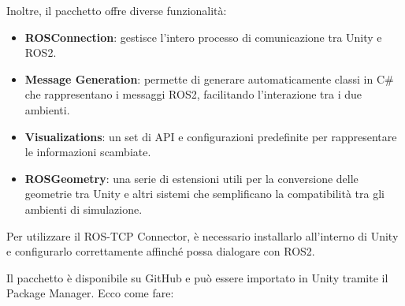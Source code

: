 \documentclass[11pt]{report}
\begin{document}
Inoltre, il pacchetto offre diverse funzionalità:

\begin{itemize}
    \item \textbf{ROSConnection}: gestisce l’intero processo di comunicazione tra Unity e ROS2.
    \item \textbf{Message Generation}: permette di generare automaticamente classi in C\# che rappresentano i messaggi ROS2, facilitando l’interazione tra i due ambienti.
    \item \textbf{Visualizations}: un set di API e configurazioni predefinite per rappresentare le informazioni scambiate.
    \item \textbf{ROSGeometry}: una serie di estensioni utili per la conversione delle geometrie tra Unity e altri sistemi che semplificano la compatibilità tra gli ambienti di simulazione.
\end{itemize}

Per utilizzare il ROS-TCP Connector, è necessario installarlo all’interno di Unity e configurarlo correttamente affinché possa dialogare con ROS2.

Il pacchetto è disponibile su GitHub e può essere importato in Unity tramite il Package Manager. Ecco come fare:
\end{document}
